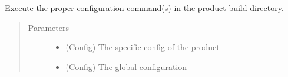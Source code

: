 \documentclass[a4paper,10pt,english]{sphinxmanual}
\begin{document}
\begin{fulllineitems}
\label{\detokenize{apidoc_commands/commands:commands.compile.add_compile_config_file}}
Execute the proper configuration command(s) 
in the product build directory.
\begin{quote}\begin{description}
\item[{Parameters}] \leavevmode\begin{itemize}
\item {} 
 \textendash{} (Config) The specific config of the product

\item {} 
 \textendash{} (Config) The global configuration

\end{itemize}

\end{description}\end{quote}

\end{fulllineitems}


\begin{fulllineitems}
\label{\detokenize{apidoc_commands/commands:commands.compile.check_dependencies}}
\end{fulllineitems}

\end{document}
